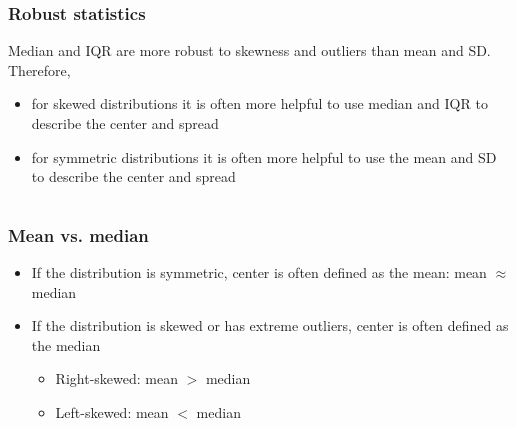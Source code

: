 \documentclass[slidestop,compress,mathserif]{beamer}
\newcommand{\soln}[1]{\textit{#1}}
\begin{document}
\begin{frame}
\frametitle{Robust statistics}

Median and IQR are more robust to skewness and outliers than mean and SD. Therefore,

\begin{itemize}
\item for skewed distributions it is often more helpful to use median and IQR to describe the center and spread
\item for symmetric distributions it is often more helpful to use the mean and SD to describe the center and spread
\end{itemize}

$\:$ \\

\pause


\soln{}

\end{frame}


\begin{frame}
\frametitle{Mean vs. median}

\begin{itemize}

\item If the distribution is symmetric, center is often defined as the mean: mean $\approx$ median

\begin{center}
\end{center}

\item If the distribution is skewed or has extreme outliers, center is often defined as the median
\begin{itemize}
\item Right-skewed: mean $>$ median
\item Left-skewed: mean $<$ median \\
\end{itemize}

\end{itemize}

\begin{center}
\end{center}

\end{frame}
\end{document}

